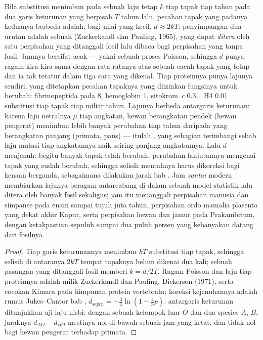 \begin{proposition}\label{prop:b3:molecular-evolution:clock}
%
Bila substitusi menimbun pada sebuah laju tetap $k$ tiap tapak tiap tahun pada
dua garis keturunan yang berpisah $T$ tahun lalu, pecahan tapak yang padanya
keduanya berbeda adalah, bagi nilai yang kecil, $d \approx 2kT$: penyimpangan
dua urutan adalah sebuah \emph{} (Zuckerkandl dan Pauling,
1965), yang dapat \emph{ditera} oleh satu perpisahan yang ditanggali fosil lalu
dibaca bagi perpisahan yang tanpa fosil. Jamnya bersifat acak --- yakni sebuah proses
Poisson, sehingga $d$ punya ragam kira-kira sama dengan rata-ratanya atas sebuah cacah
tapak yang tetap --- dan ia tak teratur dalam tiga cara yang dikenal. Tiap
proteinnya punya lajunya sendiri, yang ditetapkan pecahan tapaknya yang
diizinkan fungsinya untuk berubah: fibrinopeptida pada \num{8}, hemoglobin
\num{1}, sitokrom~$c$ \num{0.3}, ~H4 \num{0.01} substitusi
tiap tapak tiap miliar tahun. Lajunya berbeda antargaris keturunan: karena
laju netralnya $\mu$ tiap angkatan, hewan berangkatan pendek
(hewan pengerat) menimbun lebih banyak perubahan tiap tahun daripada yang berangkatan panjang
(primata, paus) --- itulah \emph{}, yang sebagian terimbangi
sebab laju mutasi tiap angkatannya naik seiring panjang angkatannya.
Lalu $d$ menjenuh: begitu banyak tapak telah berubah, perubahan lanjutannya mengenai
tapak yang sudah berubah, sehingga selisih mentahnya harus dikoreksi bagi
kenaan berganda, sebagaimana dilakukan jarak bab . Jam
\emph{santai} modern membiarkan lajunya beragam antarcabang di dalam sebuah
model statistik lalu ditera oleh banyak fosil sekaligus; jam itu
menanggali perpisahan manusia dan simpanse pada enam sampai tujuh juta
tahun, perpisahan ordo mamalia plasenta yang dekat akhir Kapur, serta
perpisahan hewan dan jamur pada Prakambrium, dengan ketakpastian sepuluh sampai
dua puluh persen yang kebanyakan datang dari fosilnya.
\end{proposition}
\begin{proof}
Tiap garis keturunannya menimbun $kT$ substitusi tiap tapak, sehingga
selisih di antaranya $2kT$ tempat tapaknya belum dikenai dua kali;
sebuah pasangan yang ditanggali fosil memberi $k = d/2T$. Ragam Poisson dan
laju tiap proteinnya adalah milik Zuckerkandl dan Pauling, Dickerson (1971), serta
cocokan Kimura pada himpunan protein vertebrata; koreksi kejenuhannya adalah
rumus Jukes--Cantor bab , $d_{\text{sejati}} =
-\tfrac{3}{4}\ln(1 - \tfrac{4}{3}p)$.  antargaris keturunan
ditunjukkan uji laju nisbi: dengan sebuah kelompok luar $O$ dan dua spesies
$A$, $B$, jaraknya $d_{AO} - d_{BO}$ mestinya nol di bawah sebuah
jam yang ketat, dan tidak nol bagi hewan pengerat terhadap primata.
\end{proof}

